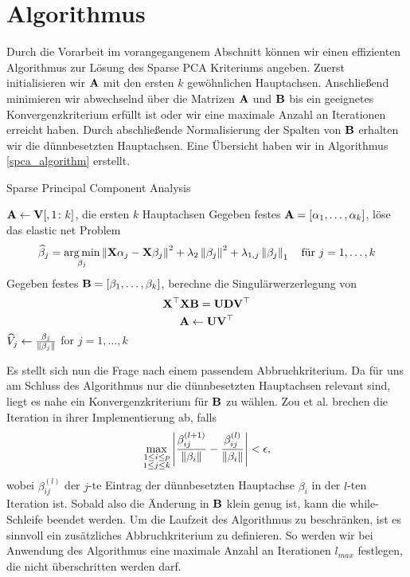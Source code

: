 

\section{Algorithmus}

Durch die Vorarbeit im vorangegangenem Abschnitt können wir einen effizienten Algorithmus zur Lösung des Sparse PCA Kriteriums angeben. Zuerst initialisieren wir $\mathbf{A}$ mit den ersten $k$ gewöhnlichen Hauptachsen. Anschließend minimieren wir abwechselnd über die Matrizen $\mathbf{A}$ und $\mathbf{B}$ bis ein geeignetes Konvergenzkriterium erfüllt ist oder wir eine maximale Anzahl an Iterationen erreicht haben. Durch abschließende Normalisierung der Spalten von $\mathbf{B}$ erhalten wir die dünnbesetzten Hauptachsen. Eine Übersicht haben wir in Algorithmus \ref{spca_algorithm} erstellt.

\begin{algorithm}[tbh]
    \caption{Sparse Principal Component Analysis}
    \label{spca_algorithm}
    \begin{algorithmic}[1]
        	\State $\mathbf{A} \gets \mathbf{V}[,1 \colon k]$, die ersten $k$ Hauptachsen
                \State Gegeben festes $\mathbf{A} = [\alpha_1, \ldots, \alpha_k]$, löse das elastic net Problem
                $$\widehat{\beta}_j = \operatorname*{arg\,min}_{\beta_j} \left\lVert \mathbf{X} \alpha_j - \mathbf{X} \beta_j \right\rVert^{2} + \lambda_2 \left\lVert \beta_j \right\rVert^2 + \lambda_{1,j}\left\lVert \beta_j \right\rVert_{1} \quad \text{für } j = 1, \ldots, k$$
                \State Gegeben festes $\mathbf{B} = [\beta_1, \ldots, \beta_k]$, berechne die Singulärwerzerlegung von $$\mathbf{X}^{\top} \mathbf{X} \mathbf{B} = \mathbf{U} \mathbf{D} \mathbf{V}^{\top}$$
                $$\mathbf{A} \gets \mathbf{U} \mathbf{V}^{\top}$$
            \EndWhile
            \State $\widehat{V}_j \gets \frac{\beta_j}{\left\lVert \beta_j \right\rVert}$ for $j = 1, \ldots, k$
        \EndProcedure
    \end{algorithmic}
\end{algorithm} 

Es stellt sich nun die Frage nach einem passendem Abbruchkriterium. Da für uns am Schluss des Algorithmus nur die dünnbesetzten Hauptachsen relevant sind, liegt es nahe ein Konvergenzkriterium für $\mathbf{B}$ zu wählen. Zou et al. brechen die Iteration in ihrer Implementierung ab, falls
$$\max_{\substack{1 \leq i \leq p \\ 1 \leq j \leq k}} \left| \frac{\beta_{ij}^{(l+1)}}{\left\lVert \beta_i \right\rVert} - \frac{\beta_{ij}^{(l)}}{\left\lVert \beta_i \right\rVert} \right| < \epsilon ,$$
wobei $\beta_{ij}^{(l)}$ der $j$-te Eintrag der dünnbesetzten Hauptachse $\beta_i$ in der $l$-ten Iteration ist. Sobald also die Änderung in $\mathbf{B}$ klein genug ist, kann die while-Schleife beendet werden. Um die Laufzeit des Algorithmus zu beschränken, ist es sinnvoll ein zusätzliches Abbruchkriterium zu definieren. So werden wir bei Anwendung des Algorithmus eine maximale Anzahl an Iterationen $l_{max}$ festlegen, die nicht überschritten werden darf.


